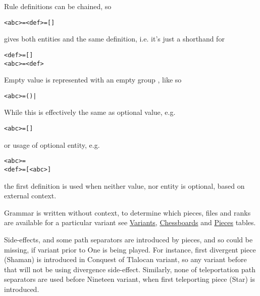 Rule definitions can be chained, so
\begin{alltt}
<abc> = <def> =  [  ] 
\end{alltt}
gives both entities  and  the same definition,
i.e. it's just a shorthand for
\begin{alltt}
<def> =  [  ] 
<abc> = <def>
\end{alltt}

\clearpage %

Empty value is represented with an empty group \algfmt{()}, like so
\begin{alltt}
<abc> = () | 
\end{alltt}

While this is effectively the same as optional value, e.g.
\begin{alltt}
<abc> = [  ]
\end{alltt}

or usage of optional entity, e.g.
\begin{alltt}
<abc> = 
<def> =  [ <abc> ]
\end{alltt}
the first definition is used when neither value, nor entity is optional,
based on external context.

Grammar is written without context, to determine which pieces, files and ranks
are available for a particular variant see
\hyperref[tbl:Appendix/Introduction/Variants]{Variants},
\hyperref[tbl:Appendix/Introduction/Chessboards]{Chessboards} and
\hyperref[tbl:Appendix/Introduction/Pieces]{Pieces} tables.

Side-effects, and some path separators are introduced by pieces, and so could
be missing, if variant prior to One is being played. For instance, first
divergent piece (Shaman) is introduced in Conquest of Tlalocan variant, so any
variant before that will not be using divergence side-effect. Similarly, none
of teleportation path separators are used before Nineteen variant, when first
teleporting piece (Star) is introduced.

\clearpage %


